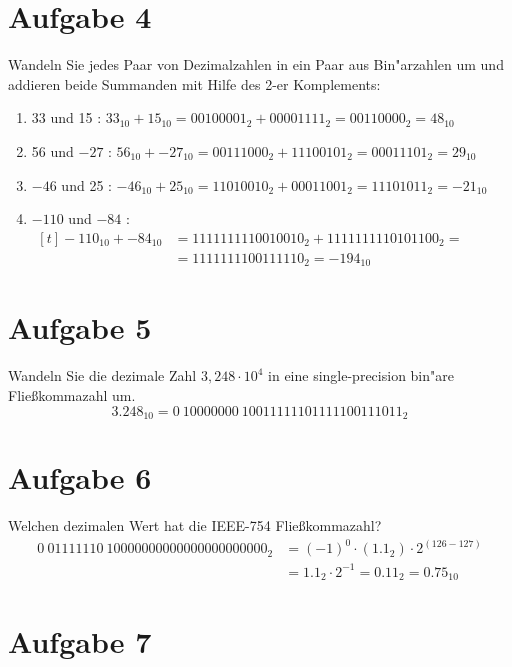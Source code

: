 \documentclass[10pt, oneside]{article}
\begin{document}
\section{Aufgabe 4}

Wandeln Sie jedes Paar von Dezimalzahlen in ein Paar aus Bin"arzahlen um und
addieren beide Summanden mit Hilfe des 2-er Komplements:
\begin{enumerate}
    \item 33 und 15 : $33_{10} + 15_{10} = 00100001_2 + 00001111_2 = 00110000_2 = 48_{10}$
    \item 56 und $-27$ : $56_{10} + -27_{10} = 00111000_2 + 11100101_2 = 00011101_2 = 29_{10}$
    \item $-46$ und 25 : $-46_{10} + 25_{10} = 11010010_2 + 00011001_2 = 11101011_2 = -21_{10}$
    \item $-110$ und $-84$ : $\begin{aligned}[t]-110_{10} + -84_{10} &= 1111111110010010_2 + 1111111110101100_2 =\\&= 1111111100111110_2 = -194_{10}\end{aligned}$
\end{enumerate}

\section{Aufgabe 5}

Wandeln Sie die dezimale Zahl $3,248 \cdot 10^4$ in eine single-precision
bin"are Flie{\ss}kommazahl um.
\begin{equation*}
    3.248_{10} = 0\ 10000000\ 10011111101111100111011_2
\end{equation*}

\section{Aufgabe 6}

Welchen dezimalen Wert hat die IEEE-754 Flie{\ss}kommazahl?
\begin{align*}
    0\ 01111110\ 10000000000000000000000_2 &= (-1)^0 \cdot (1.1_2) \cdot 2^{(126 - 127)} \\
                                           &= 1.1_2 \cdot 2^{-1} = 0.11_2 = 0.75_{10}
\end{align*}

\section{Aufgabe 7}
\end{document}
